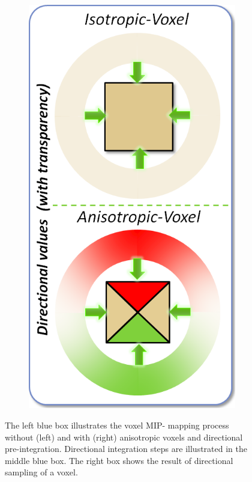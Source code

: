 \begin{figure}
\begin{subfigure}[b]{0.215\textwidth}
		\includegraphics[width=1.0\textwidth]{graphics/vct/vct-10-2}
	\end{subfigure}
	\caption{The left blue box illustrates the voxel MIP- mapping process without (left) and with (right) anisotropic voxels and directional pre-integration. Directional integration steps are illustrated in the middle blue box. The right box shows the result of directional sampling of a voxel.}
\end{figure}

